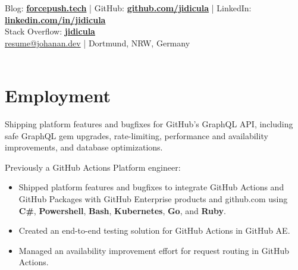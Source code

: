 \documentclass[]{jidicula-resume}
\begin{document}
\livelocation\hfill\lastupdated{}

{ Blog: \href{http://forcepush.tech}{\bf forcepush.tech}
  | GitHub: \href{http://github.com/jidicula}{\bf github.com/jidicula} | LinkedIn: \href{https://linkedin.com/in/jidicula}{\bf linkedin.com/in/jidicula} \\
  Stack Overflow: \href{https://stackoverflow.com/users/6310633/jidicula}{\bf jidicula} \\ \href{mailto:resume@johanan.dev}{resume@johanan.dev}
  | Dortmund, NRW, Germany \\~\\
}

\section{Employment}

\vspace{\topsep} %
\begin{tightemize}
\item Shipping platform features and bugfixes for GitHub's GraphQL API, including safe GraphQL gem upgrades, rate-limiting, performance and availability improvements, and database optimizations.
\item Previously a GitHub Actions Platform engineer:
  \begin{itemize}
  \item Shipped platform features and bugfixes to integrate GitHub Actions and GitHub Packages with GitHub Enterprise products and github.com using \textbf{C\#}, \textbf{Powershell}, \textbf{Bash}, \textbf{Kubernetes}, \textbf{Go}, and \textbf{Ruby}.
  \item Created an end-to-end testing solution for GitHub Actions in GitHub AE.
  \item Managed an availability improvement effort for request routing in GitHub Actions.
  \end{itemize}
\end{tightemize}
\sectionsep{}
\end{document}
